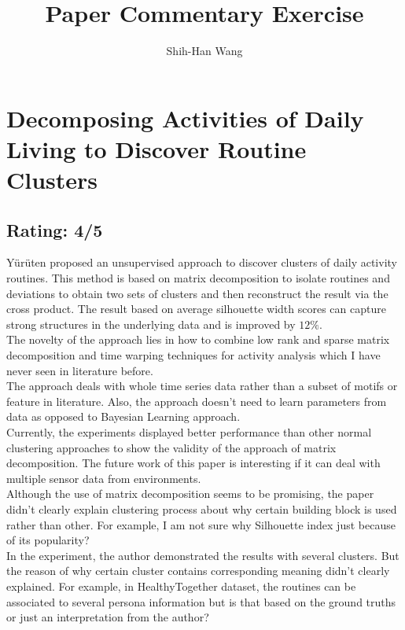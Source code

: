 \documentclass[a4paper]{article}
\title{Paper Commentary Exercise}
\author{Shih-Han Wang}
\begin{document}
\maketitle
\section{Decomposing Activities of Daily Living to Discover Routine Clusters}
\subsection{Rating: 4/5}
Y\"{u}r\"{u}ten \cite{aaai_YurutenZP14} proposed an unsupervised approach to discover clusters of daily activity routines. This method is based on matrix decomposition to isolate routines and deviations to obtain two sets of clusters and then reconstruct the result via the cross product. The result based on average silhouette width scores can capture strong structures in the underlying data and is improved by $12\%$.\\

The novelty of the approach lies in how to combine low rank and sparse matrix decomposition and time warping techniques for activity analysis which I have never seen in literature before. \\

The approach deals with whole time series data rather than a subset of motifs or feature in literature. Also, the approach doesn't need to learn parameters from data as opposed to Bayesian Learning approach.\\

Currently, the experiments displayed better performance than other normal clustering approaches to show the validity of the approach of matrix decomposition. The future work of this paper is interesting if it can deal with multiple sensor data from  environments.\\ 

Although the use of matrix decomposition seems to be promising, the paper didn't clearly explain clustering process about why certain building block is used rather than other. For example, I am not sure why Silhouette index just because of its popularity?\\

In the experiment, the author demonstrated the results with several clusters. But the reason of why certain cluster contains corresponding meaning didn't clearly explained. For example, in HealthyTogether dataset, the routines can be associated to several persona information but is that based on the ground truths or just an interpretation from the author?\\



\end{document}
